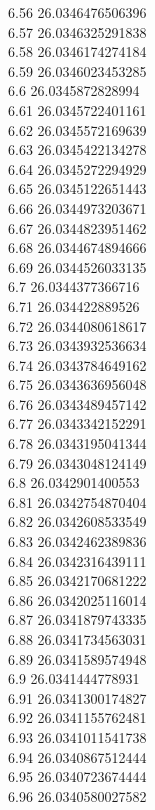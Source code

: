 {6.56	26.0346476506396\\
6.57	26.0346325291838\\
6.58	26.0346174274184\\
6.59	26.0346023453285\\
6.6	26.0345872828994\\
6.61	26.0345722401161\\
6.62	26.0345572169639\\
6.63	26.0345422134278\\
6.64	26.0345272294929\\
6.65	26.0345122651443\\
6.66	26.0344973203671\\
6.67	26.0344823951462\\
6.68	26.0344674894666\\
6.69	26.0344526033135\\
6.7	26.0344377366716\\
6.71	26.034422889526\\
6.72	26.0344080618617\\
6.73	26.0343932536634\\
6.74	26.0343784649162\\
6.75	26.0343636956048\\
6.76	26.0343489457142\\
6.77	26.0343342152291\\
6.78	26.0343195041344\\
6.79	26.0343048124149\\
6.8	26.0342901400553\\
6.81	26.0342754870404\\
6.82	26.0342608533549\\
6.83	26.0342462389836\\
6.84	26.0342316439111\\
6.85	26.0342170681222\\
6.86	26.0342025116014\\
6.87	26.0341879743335\\
6.88	26.0341734563031\\
6.89	26.0341589574948\\
6.9	26.0341444778931\\
6.91	26.0341300174827\\
6.92	26.0341155762481\\
6.93	26.0341011541738\\
6.94	26.0340867512444\\
6.95	26.0340723674444\\
6.96	26.0340580027582\\
}
